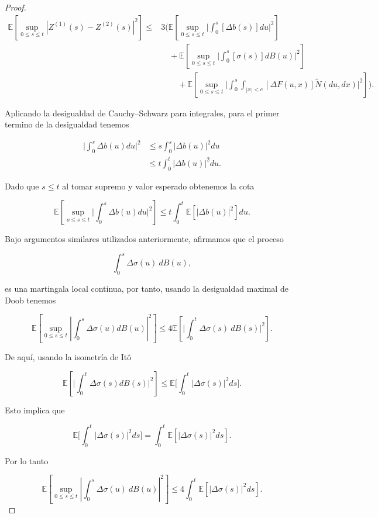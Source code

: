 \documentclass[
  spanish,
  us-letterpaper,
]{scrreprt}
\theoremstyle{plain}
\theoremstyle{plain}
\theoremstyle{plain}
\theoremstyle{definition}
\theoremstyle{remark}
\begin{document}
\begin{proof}
\[
    \begin{aligned}
        \mathbb{E}\left[\sup\limits_{0\leq s\leq t}|Z^{(1)}(s) - Z^{(2)}(s)|^2\right] \leq & 3\Bigg(\mathbb{E}\left[\sup\limits_{0\leq s\leq t}\Bigg|\int_0^s [\Delta b(s)]du\Bigg|^2\right]\\ 
        &\quad + \mathbb{E}\left[\sup\limits_{0\leq s\leq t}\Bigg|\int_0^s [\sigma(s)]dB(u)\Bigg|^2\right]\\ 
        & \qquad + \mathbb{E}\left[\sup\limits_{0\leq s\leq t}\Bigg|\int_0^s\int_{|x|<c} [\Delta F(u,x)]\widetilde{N}(du,dx)\Bigg|^2\right]\Bigg).
    \end{aligned}
\]

Aplicando la desigualdad de Cauchy--Schwarz para integrales, para el
primer termino de la desigualdad tenemos

\[
    \begin{aligned}
        \Bigg|\int_0^s \Delta b(u)du\Bigg|^2 & \leq s\int_0^s |\Delta b(u)|^2du\\ 
        & \leq t\int_0^t |\Delta b(u)|^2du.
    \end{aligned}
\]

Dado que \(s\leq t\) al tomar supremo y valor esperado obtenemos la cota

\[
\mathbb{E}\left[\sup\limits_{o\leq s\leq t}\Bigg|\int_0^s \Delta b(u)du\Bigg|^2\right]\leq t\int_0^t \mathbb{E}[|\Delta b(u)|^2]du.
\]

Bajo argumentos similares utilizados anteriormente, afirmamos que el
proceso

\[
    \int_0^s \Delta \sigma (u)\ dB(u), 
\]

es una martingala local continua, por tanto, usando la desigualdad
maximal de Doob tenemos

\[
    \mathbb{E}\left[\sup\limits_{0\leq s\leq t}\left|\int_0^s \Delta \sigma (u)dB(u)\right|^2\right]\leq 4\mathbb{E}\left[\Bigg|\int_0^t \Delta \sigma (s)\ dB(s)\Bigg|^2\right].
\]

De aquí, usando la isometría de Itô

\[
\mathbb{E}\left[\Bigg|\int_0^t \Delta \sigma (s) dB(s)\Bigg|^2\right] \leq \mathbb{E}\Bigg[\int_0^t |\Delta \sigma (s)|^2ds\Bigg].
\]

Esto implica que

\[
    \mathbb{E}\Bigg[\int_0^t |\Delta \sigma (s)|^2ds\Bigg] = \int_0^t \mathbb{E}[|\Delta \sigma (s)|^2ds].
\]

Por lo tanto

\[
    \mathbb{E}\left[\sup\limits_{0\leq s\leq t}\left|\int_0^s \Delta \sigma (u)\ dB(u)\right|^2\right]\leq 4\int_0^t \mathbb{E}[|\Delta \sigma (s)|^2ds].
\]


\end{proof}
\end{document}
